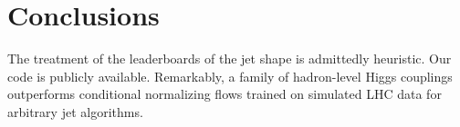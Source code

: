 \section{Conclusions}\label{sec:conclusions}

The treatment of the leaderboards of the jet shape is admittedly
heuristic. Our code is publicly available. Remarkably, a family of
hadron-level Higgs couplings outperforms conditional normalizing flows
trained on simulated LHC data for arbitrary jet algorithms.

